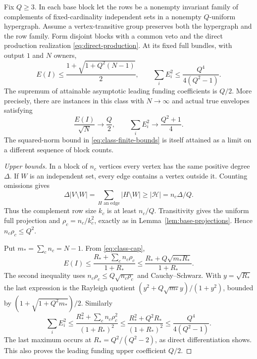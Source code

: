 \begin{theorem}
\label{thm:sharp-class}
Fix $Q\ge3$.  In each base block let the rows be a nonempty invariant
family of complements of fixed-cardinality independent sets in a
nonempty $Q$-uniform hypergraph.  Assume a vertex-transitive group
preserves both the hypergraph and the row family.  Form disjoint blocks
with a common veto and the direct production realization
\eqref{eq:direct-production}.  At its fixed full bundles, with output
$1$ and $N$ owners,
\begin{equation}
 E(I)\le\frac{1+\sqrt{1+Q^2(N-1)}}2,\qquad
 \sum_i E_i^2\le\frac{Q^4}{4(Q^2-1)}.
 \label{eq:class-finite-bounds}
\end{equation}
The supremum of attainable asymptotic leading funding coefficients is
$Q/2$.  More precisely, there are instances in this class with $N\to\infty$
and actual true envelopes satisfying
\begin{equation}
 \frac{E(I)}{\sqrt N}\longrightarrow\frac Q2,\qquad
 \sum_i E_i^2\longrightarrow\frac{Q^2+1}{4}.
 \label{eq:sharp-c-one}
\end{equation}
The squared-norm bound in \eqref{eq:class-finite-bounds} is itself
attained as a limit on a different sequence of block counts.
\end{theorem}
\begin{proof}[Upper bounds]
In a block of $n_c$ vertices every vertex has the same positive degree
$\Delta$.  If $W$ is an independent set, every edge contains a vertex
outside it.  Counting omissions gives
\[
 \Delta|V\setminus W|=\sum_{H\text{ an edge}}|H\setminus W|
                     \ge |\mathcal H|=n_c\Delta/Q.
\]
Thus the complement row size $k_c$ is at least $n_c/Q$.
Transitivity gives the uniform full projection and
$\rho_c=n_c/k_c^2$, exactly as in Lemma~\ref{lem:base-projections}.
Hence $n_c\rho_c\le Q^2$.

Put $m_* =\sum_c n_c=N-1$.  From \eqref{eq:class-cap},
\[
 E(I)\le\frac{R_*+\sum_c n_c\rho_c}{1+R_*}
 \le\frac{R_*+Q\sqrt{m_*R_*}}{1+R_*}.
\]
The second inequality uses $n_c\rho_c\le Q\sqrt{n_c\rho_c}$ and
Cauchy--Schwarz.  With $y=\sqrt{R_*}$ the last expression is the
Rayleigh quotient $(y^2+Q\sqrt{m_*}y)/(1+y^2)$, bounded by
$(1+\sqrt{1+Q^2m_*})/2$.  Similarly
\[
 \sum_i E_i^2\le
 \frac{R_*^2+\sum_c n_c\rho_c^2}{(1+R_*)^2}
 \le\frac{R_*^2+Q^2R_*}{(1+R_*)^2}
 \le\frac{Q^4}{4(Q^2-1)}.
\]
The last maximum occurs at $R_*=Q^2/(Q^2-2)$, as direct
differentiation shows.  This also proves the leading funding upper
coefficient $Q/2$.
\end{proof}

